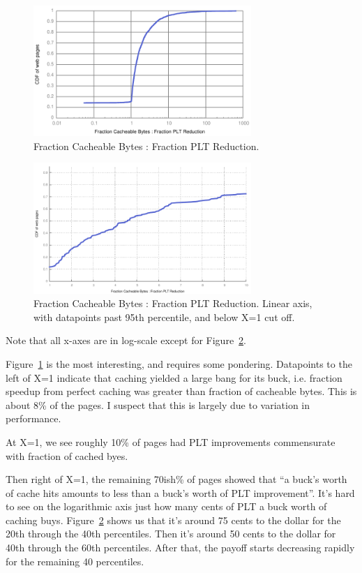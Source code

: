 \begin{figure}[t]
    \includegraphics[width=3.25in]{../graphs/ratio_bytes_to_reduction/ratio.pdf}
    \caption[]{\label{fig:ratio} Fraction Cacheable Bytes : Fraction PLT
    Reduction.}
\end{figure}

\begin{figure}[t]
    \includegraphics[width=3.25in]{../graphs/ratio_bytes_to_reduction/ratio_linear.pdf}
    \caption[]{\label{fig:ratio_linear} Fraction Cacheable Bytes : Fraction PLT
    Reduction. Linear axis, with datapoints past 95th percentile, and below
    X=1 cut off.}
\end{figure}

Note that all x-axes are in log-scale except for
Figure~\ref{fig:ratio_linear}.

Figure~\ref{fig:ratio} is the most interesting, and requires some pondering.
Datapoints to the left of X=1 indicate that caching yielded a large
bang for its buck, i.e. fraction speedup from perfect caching was greater than fraction of
cacheable bytes. This is about 8\% of the pages. I suspect that this is
largely due to
variation in performance.

At X=1, we see roughly 10\% of pages had PLT improvements commensurate with
fraction of cached byes.

Then right of X=1, the remaining 70ish\% of pages showed that ``a buck's worth
of cache hits amounts to less than a buck's worth of PLT improvement''. It's
hard to see on the logarithmic axis just how many cents of PLT a buck worth of
caching buys. Figure~\ref{fig:ratio_linear} shows us that it's around 75 cents
to the dollar for the 20th through the 40th percentiles. Then it's around 50
cents to the dollar for 40th through the 60th percentiles. After that, the
payoff starts decreasing rapidly for the remaining 40 percentiles.
